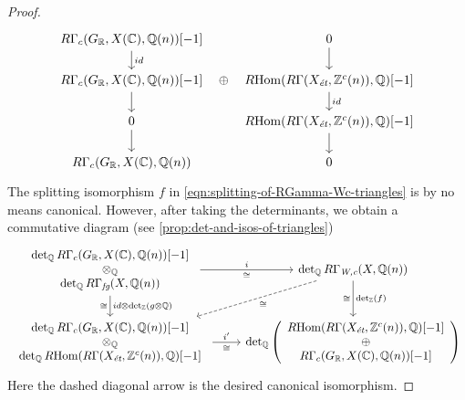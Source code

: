 \documentclass{article}
\numberwithin{equation}{section}
\begin{document}
\begin{lemma}
\begin{proof}
\[\begin{tikzcd}[row sep=1.5em]
        R\Gamma_c (G_\RR, X (\CC), \QQ (n)) [-1]\ar{d}{id} &[-2em] &[-2em] 0\ar{d} \\
        R\Gamma_c (G_\RR, X (\CC), \QQ (n)) [-1]\ar{d} & \oplus & \RHom (R\Gamma (X_\et, \ZZ^c (n)), \QQ) [-1]\ar{d}{id} \\
        0 \ar{d} & & \RHom (R\Gamma (X_\et, \ZZ^c (n)), \QQ) [-1] \ar{d} \\
        R\Gamma_c (G_\RR, X (\CC), \QQ (n)) & & 0
      \end{tikzcd} \]
    The splitting isomorphism $f$ in
    \eqref{eqn:splitting-of-RGamma-Wc-triangles} is by no means
    canonical. However, after taking the determinants, we obtain a commutative
    diagram (see \ref{prop:det-and-isos-of-triangles})
    \[ \begin{tikzcd}
        \begin{array}{c} \det_\QQ R\Gamma_c (G_\RR, X (\CC), \QQ (n)) [-1] \\ \otimes_\QQ \\ \det_\QQ R\Gamma_\fg (X, \QQ(n)) \end{array} \ar{r}{i}[swap]{\cong} \ar{d}{id \otimes \det_\ZZ (g\otimes \QQ)}[swap]{\cong} & \det_\QQ R\Gamma_\Wc (X, \QQ(n)) \ar{d}{\det_\ZZ (f)}[swap]{\cong}\ar[dashed]{dl}{\cong} \\
        \begin{array}{c} \det_\QQ R\Gamma_c (G_\RR, X (\CC), \QQ (n)) [-1] \\ \otimes_\QQ \\ \det_\QQ \RHom (R\Gamma (X_\et, \ZZ^c (n)), \QQ) [-1] \end{array} \ar{r}{i'}[swap]{\cong} & \det_\QQ \left(\begin{array}{c} \RHom (R\Gamma (X_\et, \ZZ^c (n)), \QQ) [-1] \\ \oplus \\ R\Gamma_c (G_\RR, X (\CC), \QQ (n)) [-1] \end{array}\right)
      \end{tikzcd} \]
    Here the dashed diagonal arrow is the desired canonical isomorphism.
  \end{proof}
\end{lemma}
\end{document}
